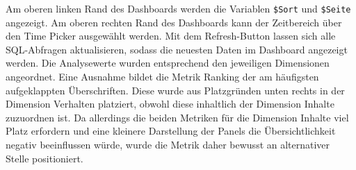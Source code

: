 Am oberen linken Rand des Dashboards werden die Variablen \texttt{\$Sort} und \texttt{\$Seite} angezeigt. Am oberen rechten Rand des Dashboards kann der Zeitbereich über den Time Picker ausgewählt werden. Mit dem Refresh-Button lassen sich alle SQL-Abfragen aktualisieren, sodass die neuesten Daten im Dashboard angezeigt werden. Die Analysewerte wurden entsprechend den jeweiligen Dimensionen angeordnet. Eine Ausnahme bildet die Metrik \glqq Ranking der am häufigsten aufgeklappten Überschriften\grqq{}. Diese wurde aus Platzgründen unten rechts in der Dimension \glqq Verhalten\grqq{} platziert, obwohl diese inhaltlich der Dimension \glqq Inhalte\grqq{} zuzuordnen ist. Da allerdings die beiden Metriken für die Dimension \glqq Inhalte\grqq{} viel Platz erfordern und eine kleinere Darstellung der Panels die Übersichtlichkeit negativ beeinflussen würde, wurde die Metrik daher bewusst an alternativer Stelle positioniert.